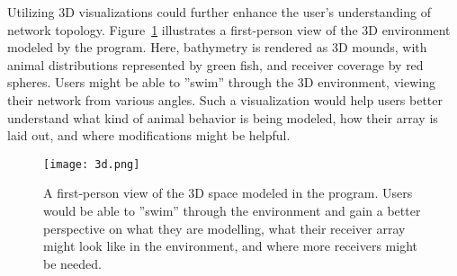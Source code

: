 Utilizing 3D visualizations could further enhance the user's understanding of network topology.  Figure~\ref{3d} illustrates a first-person view of the 3D environment modeled by the program.  Here, bathymetry is rendered as 3D mounds, with animal distributions represented by green fish, and receiver coverage by red spheres.  Users might be able to ''swim'' through the 3D environment, viewing their network from various angles.  Such a visualization would help users better understand what kind of animal behavior is being modeled, how their array is laid out, and where modifications might be helpful.

\begin{figure}[ht]
	\texttt{[image: 3d.png]}
	\caption{A first-person view of the 3D space modeled in the program.  Users would be able to ''swim'' through the environment and gain a better perspective on what they are modelling, what their receiver array might look like in the environment, and where more receivers might be needed.\label{3d}}
\end{figure}

